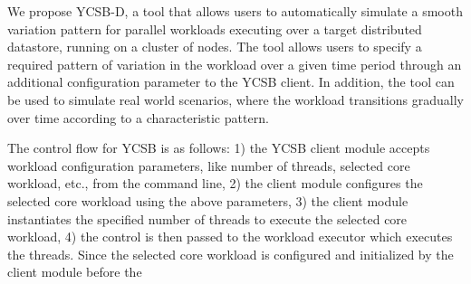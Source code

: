 \documentclass[conference]{IEEEtran}
\begin{document}
              We propose YCSB-D, a tool that allows users to automatically simulate a smooth variation pattern for parallel workloads executing
              over a target distributed datastore, running on a cluster of nodes. The tool allows users to
              specify a required pattern of variation in the workload over a given time period
              through an additional configuration parameter to the YCSB client. In addition, the tool can be used to
               simulate real world scenarios, where the workload transitions gradually over
               time according to a characteristic pattern.
               \par %
                The control flow for YCSB is as follows: 1) the YCSB client module accepts workload configuration parameters, like number of
                threads, selected core workload, etc., from the command line, 2) the client module configures the selected core workload
                using the above parameters,  3) the client module instantiates the specified number of threads to execute
                the selected core workload, 4) the control is then passed to the workload executor which
                 executes the threads.
                Since the selected core workload is configured and initialized by the client module before the
\end{document}
